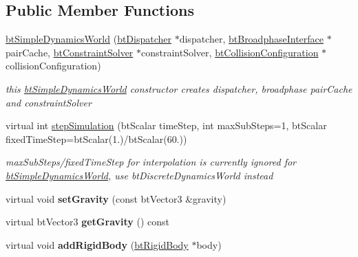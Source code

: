 \subsection*{Public Member Functions}
\begin{DoxyCompactItemize}
\item 
\mbox{\label{classbtSimpleDynamicsWorld_a7a82e6d27693ee39d4d2cdf44788ecc8}} 
\hyperlink{classbtSimpleDynamicsWorld_a7a82e6d27693ee39d4d2cdf44788ecc8}{bt\+Simple\+Dynamics\+World} (\hyperlink{classbtDispatcher}{bt\+Dispatcher} $\ast$dispatcher, \hyperlink{classbtBroadphaseInterface}{bt\+Broadphase\+Interface} $\ast$pair\+Cache, \hyperlink{classbtConstraintSolver}{bt\+Constraint\+Solver} $\ast$constraint\+Solver, \hyperlink{classbtCollisionConfiguration}{bt\+Collision\+Configuration} $\ast$collision\+Configuration)
\begin{DoxyCompactList}\small\item\em this \hyperlink{classbtSimpleDynamicsWorld}{bt\+Simple\+Dynamics\+World} constructor creates dispatcher, broadphase pair\+Cache and constraint\+Solver \end{DoxyCompactList}\item 
virtual int \hyperlink{classbtSimpleDynamicsWorld_af6b4810b5018cbaf09f82839111a243d}{step\+Simulation} (bt\+Scalar time\+Step, int max\+Sub\+Steps=1, bt\+Scalar fixed\+Time\+Step=bt\+Scalar(1.)/bt\+Scalar(60.))
\begin{DoxyCompactList}\small\item\em max\+Sub\+Steps/fixed\+Time\+Step for interpolation is currently ignored for \hyperlink{classbtSimpleDynamicsWorld}{bt\+Simple\+Dynamics\+World}, use bt\+Discrete\+Dynamics\+World instead \end{DoxyCompactList}\item 
\mbox{\label{classbtSimpleDynamicsWorld_aceee449dd68d64f0a90e853c929bf6d3}} 
virtual void {\bfseries set\+Gravity} (const bt\+Vector3 \&gravity)
\item 
\mbox{\label{classbtSimpleDynamicsWorld_abd6ceb818d0b851d3d0bc89a8d207f4a}} 
virtual bt\+Vector3 {\bfseries get\+Gravity} () const
\item 
\mbox{\label{classbtSimpleDynamicsWorld_a7c6178205587e7a36f5a7082db16b3a2}} 
virtual void {\bfseries add\+Rigid\+Body} (\hyperlink{classbtRigidBody}{bt\+Rigid\+Body} $\ast$body)

\end{DoxyCompactItemize}
